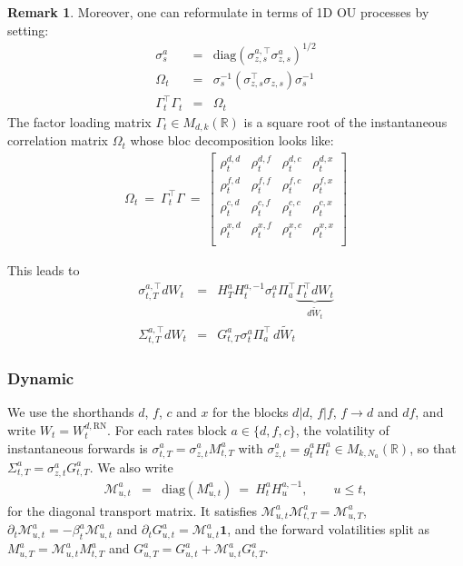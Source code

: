 \documentclass[11pt,english]{amsart}
\newcommand{\diag}{\mathrm{diag}}
\newcommand{\vun}{\mathbf{1}}
\newcommand{\RN}{\mathrm{RN}}
\newcommand{\RR}{\mathbb{R}}
\theoremstyle{definition}
\newtheorem{rema}{Remark}
\begin{document}
\begin{rema}
Moreover, one can reformulate in terms of 1D OU processes by setting:
\begin{eqnarray}
  \sigma^a_{s} &=& \diag\left( \sigma^{a,\top}_{z,s}  \sigma^a_{z,s}\right)^{1/2}  \\ 
  \Omega_t &=& \sigma^{-1}_{s}  \left( \sigma^{\top}_{z,s}  \sigma_{z,s}\right)  \sigma^{-1}_{s}   \\
  \Gamma^\top_t\Gamma_t &=& \Omega_t 
\end{eqnarray}
The factor loading matrix $\Gamma_{t} \in M_{d,k}(\RR)$ is a square root of the instantaneous correlation matrix $\Omega_t$ whose bloc decomposition looks like:
\begin{eqnarray}
  \Omega_t ~=~ \Gamma_{t}^\top\Gamma ~=~ 
  \begin{bmatrix}
     \rho^{d,d}_{t} &   \rho^{d,f}_{t}  &  \rho^{d,c}_{t}  &  \rho^{d,x}_{t}  \\
     \rho^{f,d}_{t} &   \rho^{f,f}_{t}  &  \rho^{f,c}_{t}  &  \rho^{f,x}_{t}  \\
     \rho^{c,d}_{t} &   \rho^{c,f}_{t}  &  \rho^{c,c}_{t}  &  \rho^{c,x}_{t}  \\
     \rho^{x,d}_{t} &   \rho^{x,f}_{t}  &  \rho^{x,c}_{t}  &  \rho^{x,x}_{t}  \\
      \end{bmatrix} 
\end{eqnarray}

This leads to 
\begin{eqnarray}
  \sigma^{a,\top}_{t,T} dW_t 
  &=& H^{a}_T H^{a,-1}_t \sigma^a_{t} \Pi_a^\top \underbrace{\Gamma_t^\top dW_t}_{d\widetilde{W}_t} \\
   \Sigma^{a,\top}_{t,T} dW_t 
  &=& G^{a}_{t,T} \sigma^a_{t} \Pi_a^\top \, d\widetilde{W}_t 
\end{eqnarray}

\end{rema}



\subsubsection{Dynamic}

We use the shorthands $d$, $f$, $c$ and $x$ for the blocks $d|d$, $f|f$, $f\to d$ and $df$, and write $W_t = W^{d,\RN}_t$. For each rates block $a\in\{d,f,c\}$, the volatility of instantaneous forwards is $\sigma^{a}_{t,T} = \sigma^a_{z,t} M^a_{t,T}$ with $\sigma^a_{z,t} = g^a_t H^a_t \in M_{k,N_a}(\RR)$, so that $\Sigma^{a}_{t,T} = \sigma^a_{z,t} G^a_{t,T}$. We also write
\begin{eqnarray}
  \mathcal{M}^a_{u,t} &=& \diag\left(M^a_{u,t}\right) ~=~ H^a_t H^{a,-1}_u , \qquad u\le t,
\end{eqnarray}
for the diagonal transport matrix. It satisfies $\mathcal{M}^a_{u,t}\mathcal{M}^a_{t,T} = \mathcal{M}^a_{u,T}$, $\partial_t \mathcal{M}^a_{u,t} = -\beta^a_t \mathcal{M}^a_{u,t}$ and $\partial_t G^a_{u,t} = \mathcal{M}^a_{u,t}\vun$, and the forward volatilities split as $M^a_{u,T} = \mathcal{M}^a_{u,t} M^a_{t,T}$ and $G^a_{u,T} = G^a_{u,t} + \mathcal{M}^a_{u,t} G^a_{t,T}$.
\end{document}
